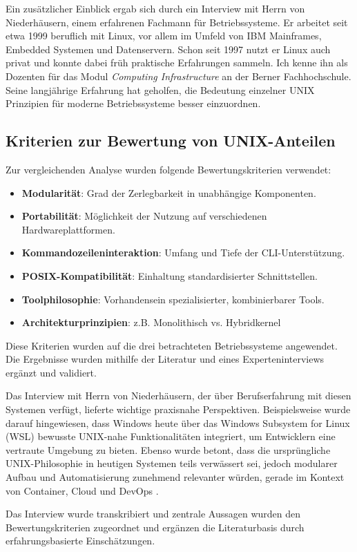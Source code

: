 Ein zusätzlicher Einblick ergab sich durch ein Interview mit Herrn von Niederhäusern, einem erfahrenen Fachmann für Betriebssysteme. Er arbeitet seit etwa
1999 beruflich mit Linux, vor allem im Umfeld von IBM Mainframes, Embedded Systemen und Datenservern. Schon seit 1997 nutzt er Linux auch privat und konnte
dabei früh praktische Erfahrungen sammeln. Ich kenne ihn als Dozenten für das Modul \textit{Computing Infrastructure} an der Berner Fachhochschule.
Seine langjährige Erfahrung hat geholfen, die Bedeutung einzelner UNIX Prinzipien für moderne Betriebssysteme besser einzuordnen.


\newpage
\subsection{Kriterien zur Bewertung von UNIX-Anteilen}

Zur vergleichenden Analyse wurden folgende Bewertungskriterien verwendet:

\begin{itemize}
	\setlength{\itemsep}{0pt}
	\item \textbf{Modularität}: Grad der Zerlegbarkeit in unabhängige Komponenten.
	\item \textbf{Portabilität}: Möglichkeit der Nutzung auf verschiedenen Hardwareplattformen.
	\item \textbf{Kommandozeileninteraktion}: Umfang und Tiefe der CLI-Unterstützung.
	\item \textbf{POSIX-Kompatibilität}: Einhaltung standardisierter Schnittstellen.
	\item \textbf{Toolphilosophie}: Vorhandensein spezialisierter, kombinierbarer Tools.
	\item \textbf{Architekturprinzipien}: z.B. Monolithisch vs. Hybridkernel
\end{itemize}

Diese Kriterien wurden auf die drei betrachteten Betriebssysteme angewendet. Die Ergebnisse wurden mithilfe der Literatur und eines Experteninterviews ergänzt und
validiert.

Das Interview mit Herrn von Niederhäusern, der über Berufserfahrung mit diesen Systemen verfügt, lieferte wichtige praxisnahe Perspektiven. Beispielsweise wurde
darauf hingewiesen, dass Windows heute über das Windows Subsystem for Linux (WSL) bewusste UNIX-nahe Funktionalitäten integriert, um Entwicklern eine vertraute
Umgebung zu bieten. Ebenso wurde betont, dass die ursprüngliche UNIX-Philosophie in heutigen Systemen teils verwässert sei, jedoch modularer Aufbau und
Automatisierung zunehmend relevanter würden, gerade im Kontext von Container, Cloud und DevOps \cite{interviewNH}.

Das Interview wurde transkribiert und zentrale Aussagen wurden den Bewertungskriterien zugeordnet und ergänzen die Literaturbasis durch erfahrungsbasierte
Einschätzungen.